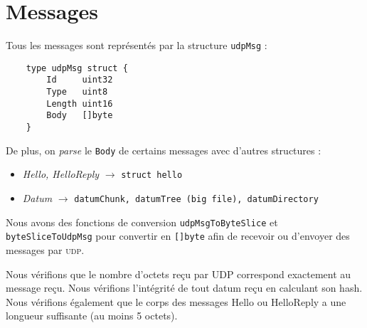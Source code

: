 \section{Messages}
Tous les messages sont représentés par la structure \texttt{udpMsg} :
\begin{verbatim}
    type udpMsg struct {
        Id     uint32
        Type   uint8
        Length uint16
        Body   []byte
    }  
\end{verbatim}
\newpage
De plus, on \textit{parse} le \texttt{Body} de certains messages avec d'autres structures :
\begin{itemize}
    \item \textit{Hello, HelloReply} $\rightarrow$ \texttt{struct hello}
    \item \textit{Datum} $\rightarrow$ \texttt{datumChunk, datumTree (big file), datumDirectory}
\end{itemize}
Nous avons des fonctions de conversion \texttt{udpMsgToByteSlice} et \texttt{byteSliceToUdpMsg} pour convertir en \texttt{[]byte} afin de recevoir ou d'envoyer des messages par \textsc{udp}.

Nous vérifions que le nombre d'octets reçu par UDP correspond exactement au message reçu. Nous vérifions l'intégrité de tout datum reçu en calculant son hash. Nous vérifions également que le corps des messages Hello ou HelloReply a une longueur suffisante (au moins 5 octets).
